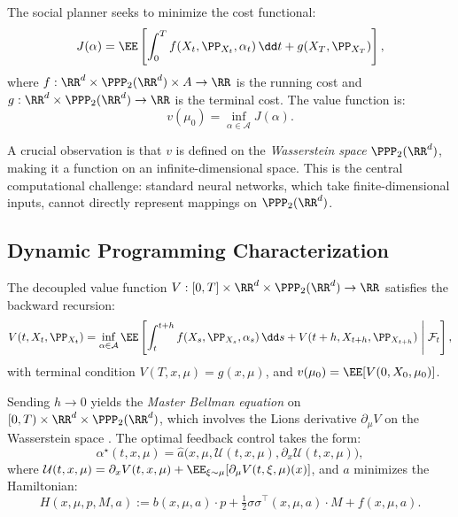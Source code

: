 \documentclass[11pt]{article}
\begin{document}
The social planner seeks to minimize the cost functional:
\begin{equation}\label{eq:mkv-cost}
  J(\alpha) = \EE\left[\int_0^T f(X_t, \PP_{X_t}, \alpha_t)\,\dd t + g(X_T, \PP_{X_T})\right],
\end{equation}
where $f : \RR^d \times \PPP_2(\RR^d) \times A \to \RR$ is the running cost and $g : \RR^d \times \PPP_2(\RR^d) \to \RR$ is the terminal cost. The value function is:
\begin{equation}\label{eq:value-fn}
  v(\mu_0) = \inf_{\alpha \in \mathcal{A}} J(\alpha).
\end{equation}

A crucial observation is that $v$ is defined on the \emph{Wasserstein space} $\PPP_2(\RR^d)$, making it a function on an infinite-dimensional space. This is the central computational challenge: standard neural networks, which take finite-dimensional inputs, cannot directly represent mappings on $\PPP_2(\RR^d)$.

\subsection{Dynamic Programming Characterization}

The decoupled value function $V : [0,T] \times \RR^d \times \PPP_2(\RR^d) \to \RR$ satisfies the backward recursion:
\begin{equation}\label{eq:dp-recursion}
  V(t, X_t, \PP_{X_t}) = \inf_{\alpha \in \mathcal{A}} \EE\left[\int_t^{t+h} f(X_s, \PP_{X_s}, \alpha_s)\,\dd s + V(t+h, X_{t+h}, \PP_{X_{t+h}}) \;\middle|\; \mathcal{F}_t\right],
\end{equation}
with terminal condition $V(T, x, \mu) = g(x, \mu)$, and $v(\mu_0) = \EE[V(0, X_0, \mu_0)]$.

Sending $h \to 0$ yields the \emph{Master Bellman equation} on $[0,T) \times \RR^d \times \PPP_2(\RR^d)$, which involves the Lions derivative $\partial_\mu V$ on the Wasserstein space \citep{carmona2018mfg1}. The optimal feedback control takes the form:
\begin{equation}\label{eq:optimal-control}
  \alpha^\star(t, x, \mu) = \hat{a}\big(x, \mu, \mathcal{U}(t,x,\mu), \partial_x \mathcal{U}(t,x,\mu)\big),
\end{equation}
where $\mathcal{U}(t,x,\mu) = \partial_x V(t,x,\mu) + \EE_{\xi \sim \mu}[\partial_\mu V(t,\xi,\mu)(x)]$, and $\hat{a}$ minimizes the Hamiltonian:
\begin{equation}
  H(x,\mu,p,M,a) := b(x,\mu,a) \cdot p + \tfrac{1}{2} \sigma\sigma^\top(x,\mu,a) \cdot M + f(x,\mu,a).
\end{equation}
\end{document}
